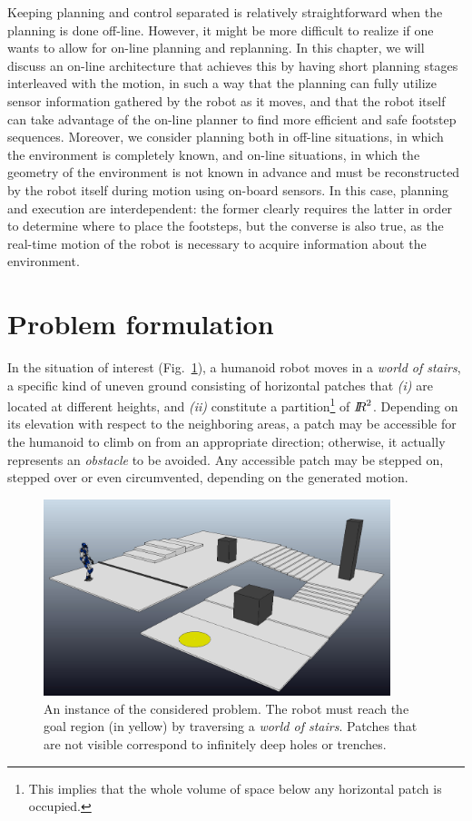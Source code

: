 Keeping planning and control separated is relatively straightforward when the
planning is done off-line. However, it might be more difficult to realize if
one wants to allow for on-line planning and replanning. In this chapter,
we will discuss an on-line architecture that achieves this by having short
planning stages interleaved with the motion, in such a way that the planning
can fully utilize sensor information gathered by the robot as it moves, and
that the robot itself can take advantage of the on-line planner to find more
efficient and safe footstep sequences.
Moreover, we consider planning both in off-line situations, in which the
environment is completely known, and on-line situations, in which the geometry
of the environment is not known in advance and must be reconstructed by the
robot itself during motion using on-board sensors. In this case, planning and
execution are interdependent: the former clearly requires the latter in order
to determine where to place the footsteps, but the converse is also true, as the
real-time motion of the robot is necessary to acquire information about the
environment.
	
\section{Problem formulation}
\label{sec:WoS:Formulation}
In the situation of interest (Fig.~\ref{fig:WoS:WoSScenario}), a humanoid robot
moves in a {\em world of stairs}, a specific kind of uneven ground consisting of
horizontal patches that {\em (i)} are located at different heights, and
{\em (ii)} constitute a partition\footnote{This implies that the whole
volume of space below any horizontal patch is occupied.} of ${I\!\!R}^2$. 
Depending on its elevation with respect to the neighboring areas, a patch may
be accessible for the humanoid to climb on from an appropriate direction;
otherwise, it actually represents an {\em obstacle} to be avoided.
Any accessible patch may be stepped on, stepped over or even circumvented,
depending on the generated motion.  

\begin{figure}
    \centering
    \includegraphics[width=0.9\textwidth]{figures/WoS_Scenario.jpeg}
    \caption{An instance of the considered problem. The robot must reach the
        goal region (in yellow) by traversing a {\em world of stairs}.
        Patches that are not visible correspond to infinitely deep holes or
        trenches.}
    \label{fig:WoS:WoSScenario}
\end{figure}

